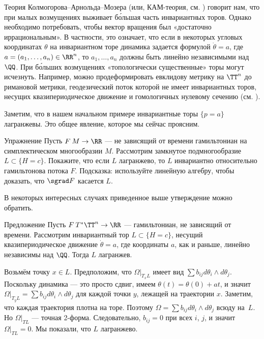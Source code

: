 Теория Колмогорова--Арнольда--Мозера (или, КАМ-теория, см. \cite{Ar})
говорит нам, что при малых возмущениях выживает б\'{о}льшая часть
инвариантных торов. 
Однако необходимо потребовать, чтобы вектор вращения был «достаточно
иррациональным». 
В частности, это означает, что если в некоторых угловых координатах
$\theta$ на инвариантном торе динамика задается формулой $\dot\theta =
a$, где $a = (a_1 ,\dots, a_n) \in \RR^n$, то $a_1 ,\dots, a_n$ должны
быть линейно независимыми над $\QQ$. 
При б\'{о}льших возмущениях «топологически существенные» торы могут исчезнуть.
Например, можно продеформировать евклидову метрику на $\TT^n$ до
римановой метрики, геодезический поток которой не имеет инвариантных
торов, несущих квазипериодическое движение и гомологичных нулевому
сечению (см. \cite{AL}). 

Заметим, что в нашем начальном примере инвариантные торы $\{p = a\}$
лагранжевы. 
Это общее явление, которое мы сейчас проясним.

\begin{thm}{Упражнение}\label{8.1.A}
  Пусть $F\: M \to \RR$ --- не зависящий от времени гамильтониан на
  симплектическом многообразии $M$.  Рассмотрим замкнутое
  подмногообразие $L \subset \{H = c\}$.  Покажите, что если $L$
  лагранжево, то $L$ инвариантно относительно гамильтонова потока $F$.
  Подсказка: используйте линейную алгебру, чтобы доказать, что $\sgrad
  F$ касается $L$.
\end{thm}

В некоторых интересных случаях приведенное выше утверждение можно обратить.

\begin{thm}[(\cite{He})]{Предложение}\label{8.1.B}
  Пусть $F\: T^\ast \TT^n \to \RR$ --- гамильтониан, не зависящий от
  времени.  Рассмотрим инвариантный тор $L \subset \{H = c\}$, несущий
  квазипериодическое движение $\dot\theta = a$, где координаты $a$,
  как и раньше, линейно независимы над $\QQ$.  Тогда $L$ лагранжев.
\end{thm}

Возьмём точку $x \in L$.
Предположим, что $\Omega|_{T_x L}$ имеет вид $\sum b_{ij} d\theta_i
\wedge d\theta_j$. 
Поскольку динамика --- это просто сдвиг, имеем $\theta (t) = \theta
(0) + at$, и значит $\Omega|_{T_y L} = \sum b_{ij} d\theta_i \wedge
d\theta_j$ для каждой точки $y$, лежащей на траектории $x$. 
Заметим, что каждая траектория плотна на торе.
Поэтому $\Omega = \sum b_{ij} d\theta_i \wedge d\theta_j$ всюду на~$L$.
Но $\Omega|_{TL}$ --- точная 2-форма.
Следовательно, $b_{ij} = 0$ при всех $i$, $j$, и значит $\Omega|_{T L} = 0$. 
Мы показали, что $L$ лагранжево.
\qeds

